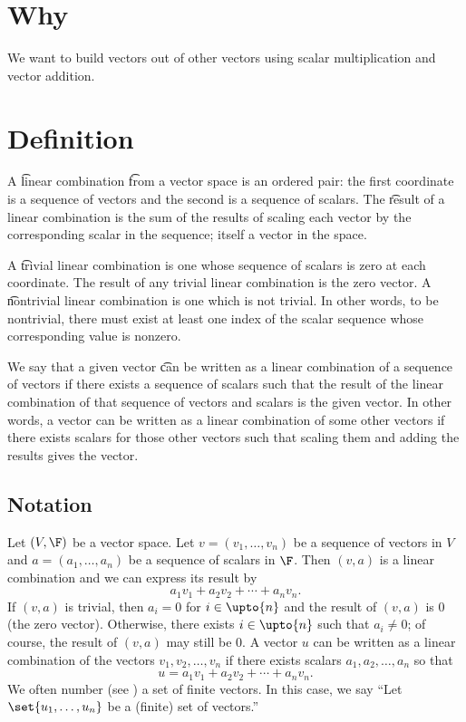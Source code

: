 
\section*{Why}

We want to build vectors out of other vectors using scalar multiplication and vector addition.

\section*{Definition}

A \t{linear combination} \t{from} a vector space is an ordered pair: the first coordinate is a sequence of vectors and the second is a sequence of scalars.
The \t{result} of a linear combination is the sum of the results of scaling each vector by the corresponding scalar in the sequence; itself a vector in the space.

A \t{trivial linear combination} is one whose sequence of scalars is zero at each coordinate.
The result of any trivial linear combination is the zero vector.
A \t{nontrivial linear combination} is one which is not trivial.
In other words, to be nontrivial, there must exist at least one index of the scalar sequence whose corresponding value is nonzero.

We say that a given vector \t{can be written as a linear combination of} a sequence of vectors if there exists a sequence of scalars such that the result of the linear combination of that sequence of vectors and scalars is the given vector.
In other words, a vector can be written as a linear combination of some other vectors if there exists scalars for those other vectors such that scaling them and adding the results gives the vector.

\subsection*{Notation}

Let $(V, \F )$ be a vector space.
Let $v = (v_1, \dots , v_n)$ be a sequence of vectors in $V$ and
$a = (a_1, \dots , a_n)$ be a sequence of scalars in $\F $.
Then $(v, a)$ is a linear combination and we can express its result by
\[
a_1v_1 + a_2v_2 + \cdots + a_n v_n.
\]
If $(v,a)$ is trivial, then $a_i = 0$ for $i \in \upto{n}$ and the result of $(v, a)$ is $0$ (the zero vector).
Otherwise, there exists $i \in \upto{n}$ such that $a_i \neq 0$; of course, the result of $(v, a)$ may still be $0$.
A vector $u$ can be written as a linear combination of the vectors $v_1, v_2, \dots , v_n$ if there exists scalars $a_1, a_2, \dots , a_n$ so that
\[
u = a_1v_1 + a_2v_2 + \cdots + a_nv_n.
\]
We often number (see ) a set of finite vectors.
In this case, we say ``Let $\set{u_1, \dots , u_n}$ be a (finite) set of vectors.''
